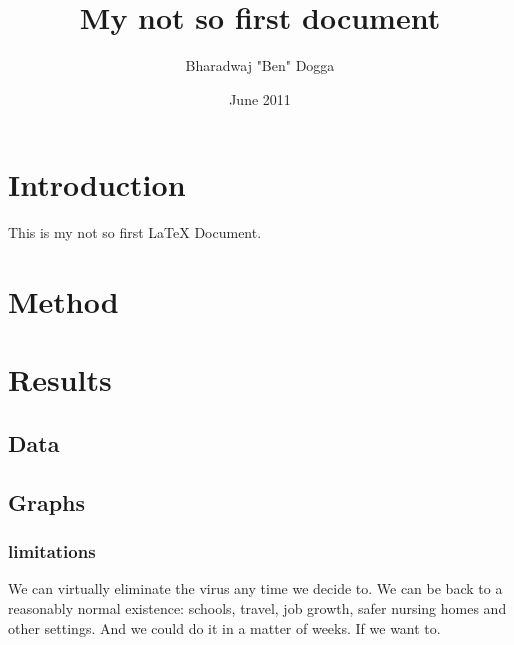 \documentclass{article}
\title{My not so first document}
\author{Bharadwaj "Ben" Dogga}
\date{June 2011}
\begin{document}
\maketitle

\section{Introduction}
This is my not so first LaTeX Document.

\section{Method}

\section{Results}
\subsection{Data}
\subsection{Graphs}
\subsubsection{limitations}

We can virtually eliminate the virus any time we decide to. We can be back to a reasonably normal existence: schools, travel, job growth, safer nursing homes and other settings. And we could do it in a matter of weeks. If we want to.
\end{document}
